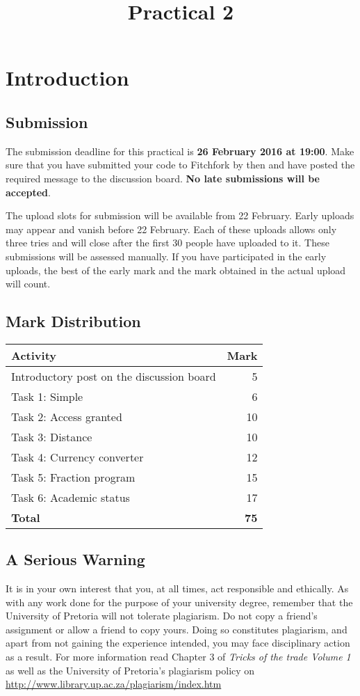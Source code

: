 \documentclass [a4paper,leqno, 12pt] {article}
\title{Practical 2}
\begin{document}
\maketitle

\section{Introduction}
\subsection{Submission}
The submission deadline for this practical is \textbf{26 February 2016 at 19:00}. Make sure that you have submitted your code to Fitchfork by then and have posted the required message to the discussion board. 
 \textbf{No late submissions will be accepted}. 

The upload slots for submission will be available from 22 February. Early uploads may appear and vanish before 22 February. Each of these uploads allows only three tries and will close after the first 30 people have uploaded to it. These submissions will be assessed manually. If you have participated in the early uploads, the best of the early mark and the mark obtained in the actual upload will count.

 \subsection{Mark Distribution}
\begin{table}[H]
	\centering
	\begin{tabular}{|l|r|}
		\hline
		\textbf{Activity} & \textbf{Mark} \\
		\hline
		Introductory post on the discussion board & 5 \\
		Task 1: Simple        & 6  \\
		Task 2: Access granted &  10\\
		Task 3: Distance     & 10  \\
		Task 4: Currency converter    & 12 \\ 
		Task 5: Fraction program         & 15 \\ 
		Task 6: Academic status & 17\\
		\hline
		\textbf{Total}    & \textbf{75} \\
		\hline
	\end{tabular}
\end{table}

\subsection{A Serious Warning}
It is in your own interest that you, at all times, act responsible and ethically. As with any work done for the purpose of your university degree, remember that the University of Pretoria will not tolerate plagiarism. Do not copy a friend's assignment or allow a friend to copy yours. Doing so constitutes plagiarism, and apart from not gaining the experience intended, you may face disciplinary action as a result. For more information read Chapter 3 of \textit{Tricks of the trade Volume 1} as well as the University of Pretoria's plagiarism policy on \url{http://www.library.up.ac.za/plagiarism/index.htm}
\end{document}
